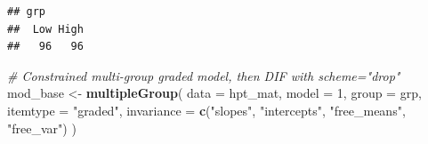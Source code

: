 \documentclass[
  10pt,
]{article}
\newenvironment{Shaded}{\begin{snugshade}}{\end{snugshade}}
\newcommand{\AttributeTok}[1]{\textcolor[rgb]{0.13,0.29,0.53}{#1}}
\newcommand{\CommentTok}[1]{\textcolor[rgb]{0.56,0.35,0.01}{\textit{#1}}}
\newcommand{\DecValTok}[1]{\textcolor[rgb]{0.00,0.00,0.81}{#1}}
\newcommand{\FunctionTok}[1]{\textcolor[rgb]{0.13,0.29,0.53}{\textbf{#1}}}
\newcommand{\NormalTok}[1]{#1}
\newcommand{\OtherTok}[1]{\textcolor[rgb]{0.56,0.35,0.01}{#1}}
\newcommand{\StringTok}[1]{\textcolor[rgb]{0.31,0.60,0.02}{#1}}
\begin{document}
\begin{verbatim}
## grp
##  Low High 
##   96   96
\end{verbatim}

\begin{Shaded}
\begin{Highlighting}[]
\CommentTok{\# Constrained multi{-}group graded model, then DIF with scheme="drop"}
\NormalTok{mod\_base }\OtherTok{\textless{}{-}} \FunctionTok{multipleGroup}\NormalTok{(}
  \AttributeTok{data       =}\NormalTok{ hpt\_mat,}
  \AttributeTok{model      =} \DecValTok{1}\NormalTok{,}
  \AttributeTok{group      =}\NormalTok{ grp,}
  \AttributeTok{itemtype   =} \StringTok{"graded"}\NormalTok{,}
  \AttributeTok{invariance =} \FunctionTok{c}\NormalTok{(}\StringTok{"slopes"}\NormalTok{, }\StringTok{"intercepts"}\NormalTok{, }\StringTok{"free\_means"}\NormalTok{, }\StringTok{"free\_var"}\NormalTok{)}
\NormalTok{)}
\end{Highlighting}
\end{Shaded}
\end{document}
